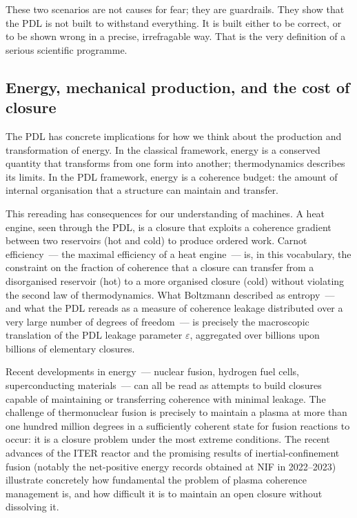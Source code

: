 \documentclass[12pt, a4paper, openright]{book}
\begin{document}
\medskip

These two scenarios are not causes for fear; they are guardrails. They show that the PDL is not built to withstand everything. It is built either to be correct, or to be shown wrong in a precise, irrefragable way. That is the very definition of a serious scientific programme.

\subsection*{Energy, mechanical production, and the cost of closure}

The PDL has concrete implications for how we think about the production and transformation of energy. In the classical framework, energy is a conserved quantity that transforms from one form into another; thermodynamics describes its limits. In the PDL framework, energy is a coherence budget: the amount of internal organisation that a structure can maintain and transfer.

\medskip

This rereading has consequences for our understanding of machines. A heat engine, seen through the PDL, is a closure that exploits a coherence gradient between two reservoirs (hot and cold) to produce ordered work. Carnot efficiency~--- the maximal efficiency of a heat engine~--- is, in this vocabulary, the constraint on the fraction of coherence that a closure can transfer from a disorganised reservoir (hot) to a more organised closure (cold) without violating the second law of thermodynamics. What Boltzmann described as entropy~--- and what the PDL rereads as a measure of coherence leakage distributed over a very large number of degrees of freedom~--- is precisely the macroscopic translation of the PDL leakage parameter $\varepsilon$, aggregated over billions upon billions of elementary closures.

\medskip

Recent developments in energy~--- nuclear fusion, hydrogen fuel cells, superconducting materials~--- can all be read as attempts to build closures capable of maintaining or transferring coherence with minimal leakage. The challenge of thermonuclear fusion is precisely to maintain a plasma at more than one hundred million degrees in a sufficiently coherent state for fusion reactions to occur: it is a closure problem under the most extreme conditions. The recent advances of the ITER reactor and the promising results of inertial-confinement fusion (notably the net-positive energy records obtained at NIF in 2022--2023) illustrate concretely how fundamental the problem of plasma coherence management is, and how difficult it is to maintain an open closure without dissolving it.
\end{document}
